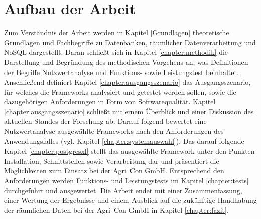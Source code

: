 \section{Aufbau der Arbeit}
Zum Verständnis der Arbeit werden in Kapitel \ref{Grundlagen} theoretische Grundlagen und Fach\-begriffe zu Datenbanken, räumlicher Datenverarbeitung und NoSQL dargestellt.
Daran schließt sich in Kapitel \ref{chapter:methodik} die Darstellung und Begründung des methodischen Vorgehens an, was Definitionen der Begriffe Nutzwertanalyse und Funktions- sowie Leistungstest beinhaltet.
Anschließend definiert Kapitel \ref{chapter:ausgangsszenario} das Ausgangsszenario, für welches die Frameworks analysiert und getestet werden sollen, sowie die dazugehörigen Anforderungen in Form von Softwarequalität.
Kapitel \ref{chapter:ausgangsszenario} schließt mit einem Überblick und einer Diskussion des aktuellen Standes der Forschung ab.
Darauf folgend bewertet eine Nutzwertanalyse ausgewählte Frameworks nach den Anforderungen des Anwendungsfalles (vgl. Kapitel \ref{chapter:systemauswahl}).
Das darauf folgende Kapitel \ref{chapter:postgresxl} stellt das ausgewählte Framework unter den Punkten Installation, Schnittstellen sowie Verarbeitung dar und präsentiert die Möglichkeiten zum Einsatz bei der Agri~Con GmbH.
Entsprechend den Anforderungen werden Funktions- und Leistungstests im Kapitel \ref{chapter:tests} durchgeführt und ausgewertet.
Die Arbeit endet mit einer Zusammenfassung, einer Wertung der Ergebnisse und einem Ausblick auf die zukünftige Handhabung der räumlichen Daten bei der Agri~Con GmbH in Kapitel \ref{chapter:fazit}.

